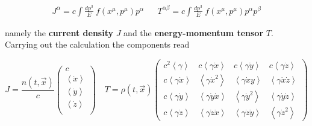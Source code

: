 \documentclass[11pt]{article}
\begin{document}
\begin{align}
J^{\alpha}= c \int \frac{dp^3}{E} \ f( x^{\mu}, p^{\mu}) p^{\alpha}  &&   T^{\alpha \beta}= c \int \frac{dp^3}{E} \ f( x^{\mu}, p^{\mu}) p^{\alpha}p^{\beta}  
\end{align}
 
namely the \textbf{current density} $J$ and the \textbf{energy-momentum tensor} $T$. Carrying out the calculation the components read 


\[
  J= \frac{n(t,\vec{x})}{c}
  \begin{pmatrix}
    c \\
    \left< \dot{x} \right> \\
    \left< \dot{y} \right> \\
    \left< \dot{z} \right> \\
  \end{pmatrix}\quad
  T= \rho(t,\vec{x})
  \begin{pmatrix}
    c^2 \left< \gamma \right> & c \left< \gamma \dot{x} \right> &  c \left< \gamma \dot{y} \right> & c \left< \gamma \dot{z} \right> \\
     c \left< \gamma \dot{x} \right> & \left< \gamma \dot{x}^2 \right> &  \left< \gamma \dot{x}y \right> &  \left< \gamma \dot{x} \dot{z} \right>  \\
     c \left< \gamma \dot{y} \right> &  \left< \gamma \dot{y} \dot{x} \right>&  \left< \gamma \dot{y}^2 \right> &  \left< \gamma \dot{y} \dot{z} \right>  \\
     c \left< \gamma \dot{z} \right> &  \left< \gamma \dot{z}\dot{x} \right>& \left< \gamma \dot{z}\dot{y} \right> &  \left< \gamma \dot{z}^2 \right> 
  \end{pmatrix}
\]
\end{document}
